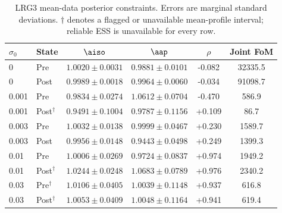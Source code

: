 \begin{table}[t]
\caption{\label{tab:baseline_LRG3}LRG3 mean-data posterior constraints. Errors are marginal standard deviations. $\dagger$ denotes a flagged or unavailable mean-profile interval; reliable ESS is unavailable for every row.}
\begin{ruledtabular}
\begin{tabular}{llcccc}
$\sigma_0$ & State & $\aiso$ & $\aap$ & $\rho$ & Joint FoM \\
\hline
0 & Pre & $1.0020\pm0.0031$ & $0.9881\pm0.0101$ & -0.082 & 32335.5 \\
0 & Post & $0.9989\pm0.0018$ & $0.9964\pm0.0060$ & -0.034 & 91098.7 \\
0.001 & Pre & $0.9834\pm0.0274$ & $1.0612\pm0.0704$ & -0.470 & 586.9 \\
0.001 & Post$^{\dagger}$ & $0.9491\pm0.1004$ & $0.9787\pm0.1156$ & +0.109 & 86.7 \\
0.003 & Pre & $1.0032\pm0.0138$ & $0.9999\pm0.0467$ & +0.230 & 1589.7 \\
0.003 & Post & $0.9956\pm0.0148$ & $0.9443\pm0.0498$ & +0.249 & 1399.3 \\
0.01 & Pre & $1.0006\pm0.0269$ & $0.9724\pm0.0837$ & +0.974 & 1949.2 \\
0.01 & Post$^{\dagger}$ & $1.0244\pm0.0248$ & $1.0683\pm0.0789$ & +0.976 & 2340.2 \\
0.03 & Pre$^{\dagger}$ & $1.0106\pm0.0405$ & $1.0039\pm0.1148$ & +0.937 & 616.8 \\
0.03 & Post$^{\dagger}$ & $1.0053\pm0.0409$ & $1.0048\pm0.1164$ & +0.941 & 619.4 \\
\end{tabular}
\end{ruledtabular}
\end{table}
